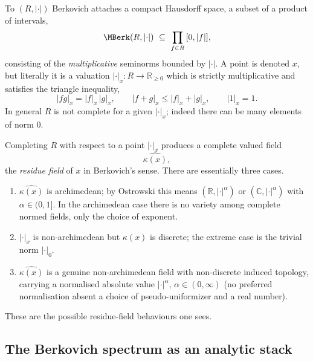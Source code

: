 To $(R,\lvert\cdot\rvert)$ Berkovich attaches a compact Hausdorff space, a subset
of a product of intervals,
\begin{equation*}
\MBerk(R,\lvert\cdot\rvert)\ \subseteq\ \prod_{f\in R}\,[0,\lvert f\rvert],
\end{equation*}
consisting of the \emph{multiplicative} seminorms bounded by
$\lvert\cdot\rvert$. A point is denoted $x$, but literally it is a valuation
$\lvert\cdot\rvert_x\colon R\to\mathbb R_{\ge0}$ which is strictly
multiplicative and satisfies the triangle inequality,
\begin{equation*}
\lvert fg\rvert_x=\lvert f\rvert_x\,\lvert g\rvert_x,\qquad
\lvert f+g\rvert_x\le\lvert f\rvert_x+\lvert g\rvert_x,\qquad
\lvert1\rvert_x=1 .
\end{equation*}
In general $R$ is not complete for a given $\lvert\cdot\rvert_x$; indeed there
can be many elements of norm $0$.

\begin{remark}
\label{rmk:23:residue-fields}
Completing $R$ with respect to a point $\lvert\cdot\rvert_x$ produces a
complete valued field
\begin{equation*}
\widehat{\kappa(x)},
\end{equation*}
the \emph{residue field} of $x$ in Berkovich's sense. There are essentially
three cases.
\begin{enumerate}
\item $\widehat{\kappa(x)}$ is archimedean; by Ostrowski this means
$(\mathbb R,\lvert\cdot\rvert^\alpha)$ or $(\mathbb C,\lvert\cdot\rvert^\alpha)$
with $\alpha\in(0,1]$. In the archimedean case there is no variety among
complete normed fields, only the choice of exponent.
\item $\lvert\cdot\rvert_x$ is non-archimedean but $\kappa(x)$ is discrete; the
extreme case is the trivial norm $\lvert\cdot\rvert_0$.
\item $\widehat{\kappa(x)}$ is a genuine non-archimedean field with non-discrete
induced topology, carrying a normalised absolute value
$\lvert\cdot\rvert^\alpha$, $\alpha\in(0,\infty)$ (no preferred normalisation
absent a choice of pseudo-uniformizer and a real number).
\end{enumerate}
These are the possible residue-field behaviours one sees.
\end{remark}

\subsection{The Berkovich spectrum as an analytic stack}
\label{subsec:23:stack}

